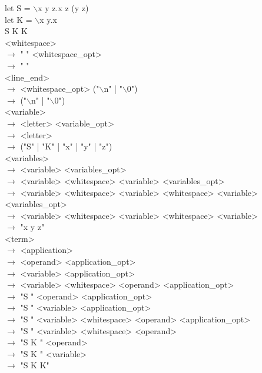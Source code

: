 \documentclass[12pt]{article}
\begin{document}
let S = $\backslash$x y z.x z (y z) \\
let K = $\backslash$x y.x \\
S K K \\

<whitespace> \\
$\rightarrow$ " " <whitespace\_opt> \\
$\rightarrow$ " " \\

<line\_end> \\
$\rightarrow$ <whitespace\_opt> ("$\backslash$n" | "$\backslash$0") \\
$\rightarrow$ ("$\backslash$n" | "$\backslash$0") \\

<variable> \\
$\rightarrow$ <letter> <variable\_opt> \\
$\rightarrow$ <letter> \\
$\rightarrow$ ("S" | "K" | "x" | "y" | "z") \\

<variables> \\
$\rightarrow$ <variable> <variables\_opt> \\
$\rightarrow$ <variable> <whitespace> <variable> <variables\_opt> \\
$\rightarrow$ <variable> <whitespace> <variable> <whitespace> <variable> <variables\_opt> \\
$\rightarrow$ <variable> <whitespace> <variable> <whitespace> <variable> \\
$\rightarrow$ "x y z" \\

<term> \\
$\rightarrow$ <application> \\
$\rightarrow$ <operand> <application\_opt> \\
$\rightarrow$ <variable> <application\_opt> \\
$\rightarrow$ <variable> <whitespace> <operand> <application\_opt> \\
$\rightarrow$ "S " <operand> <application\_opt> \\
$\rightarrow$ "S " <variable> <application\_opt> \\
$\rightarrow$ "S " <variable> <whitespace> <operand> <application\_opt> \\
$\rightarrow$ "S " <variable> <whitespace> <operand> \\
$\rightarrow$ "S K " <operand> \\
$\rightarrow$ "S K " <variable> \\
$\rightarrow$ "S K K" \\
\end{document}
